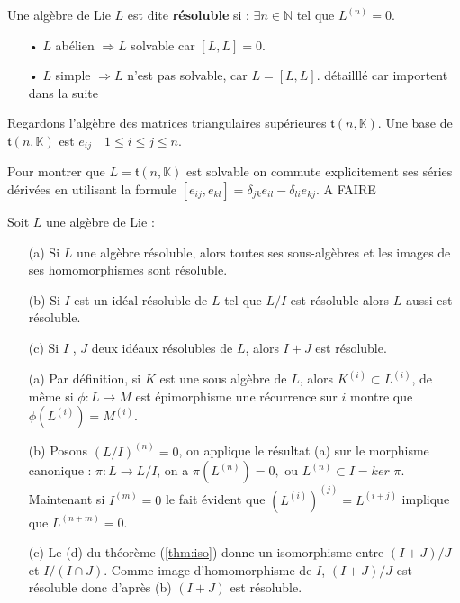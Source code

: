 \documentclass[a4paper,openany,12pt]{report}
\newcommand{\KK}{\mathbb{K}}
\newcommand{\NN}{\mathbb{N}}
\newcommand{\ttt}{\mathfrak{t}}
\theoremstyle{break}
{\theorembodyfont{\upshape}
\newtheorem*{rmq}{Remarque :}
\newtheorem*{prv}{Preuve :}
\newtheorem*{ex}{Exemples :}
\newtheorem*{exe}{Exemple : }
\newtheorem*{nota}{Notation :}
\newtheorem*{dem}{D\'emonstration :}}
\begin{document}
\begin{df}
\quad Une algèbre de Lie $L$ est dite \textbf{résoluble} si : $\exists n \in \NN $ tel que $L^{(n)}=0$.
\end{df}

\begin{rmq}
\begin{itemize}
\item[•]  $L$ abélien $\Rightarrow L$ solvable car $[L,L] = 0$.
\item[•]  $L$ simple $\Rightarrow L$ n'est pas solvable, car $L = [L,L]$.
détailllé car importent dans la suite
\end{itemize}
\end{rmq}

\begin{ex}
\quad Regardons l'algèbre des matrices triangulaires supérieures $\ttt(n,\KK)$. Une base de $\ttt(n,\KK)$ est $e_{ij}\quad1\leq i \leq j\leq n$.

Pour montrer que $L = \ttt(n,\KK)$  est solvable on commute explicitement ses séries dérivées en utilisant la formule $ [ e_{ij},e_{kl} ]  = \delta_{jk}e_{il}  -  \delta_{li}e_{kj} $.
A FAIRE 
\end{ex}

\begin{prop}\label{prop:solv}
Soit $L$ une algèbre de Lie :
\begin{itemize}
\item[(a)] Si $L$ une algèbre résoluble, alors toutes ses sous-algèbres et les images de ses homomorphismes sont résoluble.
\item[(b)] Si $I$ est un idéal résoluble de $L$ tel que $L/I$ est résoluble alors $L$ aussi est résoluble.
\item[(c)] Si $I$ , $J$ deux idéaux résolubles de $L$, alors $I+J$ est résoluble.
\end{itemize}
\end{prop}

\begin{prv}
\begin{enumerate}
\item[(a)] Par définition, si $K$ est une sous algèbre de $L$, alors $K^{(i)} \subset L^{(i)}$, de même si $\phi: L \rightarrow M$ est épimorphisme une récurrence sur $i$ montre que $\phi\left(L^{(i)}\right)=M^{(i)}$.

\item[(b)] Posons $(L / I)^{(n)}=0$, on applique le résultat (a) sur le morphisme canonique : $\pi: L \rightarrow L / I$, on a  $\pi\left(L^{(n)}\right)=0,$ ou  $L^{(n)} \subset I= ker$ $\pi$. Maintenant si  $I^{(m)}=0$ le fait évident que $\left(L^{(i)}\right)^{(j)}=L^{(i+j)}$ implique que  $L^{(n+m)}=0$. 

\item[(c)] Le (d) du théorème (\ref{thm:iso}) donne un isomorphisme entre $(I+J) / J$ et $I /(I \cap J)$. Comme image d'homomorphisme de $I$, $(I+J) / J$  est résoluble donc d'après (b)  $(I+J)$ est résoluble.
\end{enumerate}
\end{prv}
\end{document}
